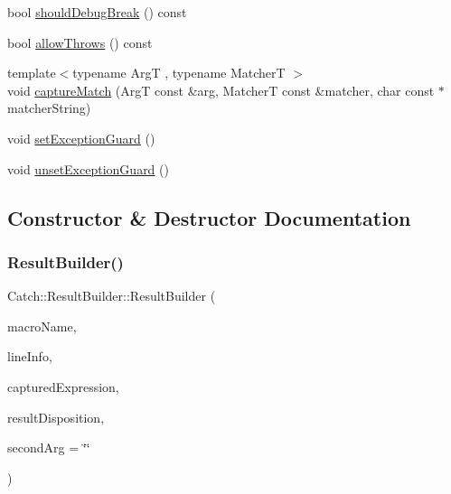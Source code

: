 \begin{DoxyCompactItemize}
bool \hyperlink{class_catch_1_1_result_builder_a6f2b0dbcc6cc5e0a500ac45f2534e3e7}{should\+Debug\+Break} () const
\item 
bool \hyperlink{class_catch_1_1_result_builder_a0428fd78ab9e8e6f1aca6855f20fc715}{allow\+Throws} () const
\item 
{\footnotesize template$<$typename ArgT , typename MatcherT $>$ }\\void \hyperlink{class_catch_1_1_result_builder_a27425538bec8fee7ac69403c5df6078c}{capture\+Match} (ArgT const \&arg, MatcherT const \&matcher, char const $\ast$matcher\+String)
\item 
void \hyperlink{class_catch_1_1_result_builder_a87929808b4ec9b6cb5838edc1f27df17}{set\+Exception\+Guard} ()
\item 
void \hyperlink{class_catch_1_1_result_builder_a0990e93c1e13f96ffe02fa0f45e8f155}{unset\+Exception\+Guard} ()
\end{DoxyCompactItemize}


\subsection{Constructor \& Destructor Documentation}
\mbox{\label{class_catch_1_1_result_builder_a8579c3056f64f9324cf1181532828376}} 
\subsubsection{\texorpdfstring{Result\+Builder()}{ResultBuilder()}}
{\footnotesize\ttfamily Catch\+::\+Result\+Builder\+::\+Result\+Builder (\begin{DoxyParamCaption}\item[{char const $\ast$}]{macro\+Name,  }\item[{\hyperlink{struct_catch_1_1_source_line_info}{Source\+Line\+Info} const \&}]{line\+Info,  }\item[{char const $\ast$}]{captured\+Expression,  }\item[{\hyperlink{struct_catch_1_1_result_disposition_a3396cad6e2259af326b3aae93e23e9d8}{Result\+Disposition\+::\+Flags}}]{result\+Disposition,  }\item[{char const $\ast$}]{second\+Arg = {\ttfamily \char`\"{}\char`\"{}} }\end{DoxyParamCaption})}

